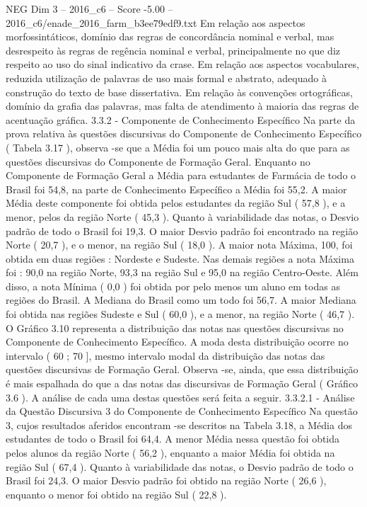 \begin{textsample}{NEG Dim 3 – 2016\_c6 – Score -5.00 – 2016\_c6/enade\_2016\_farm\_b3ee79edf9.txt}
Em relação aos aspectos morfossintáticos, domínio das regras de concordância nominal e verbal, mas desrespeito às regras de regência nominal e verbal, principalmente no que diz respeito ao uso do sinal indicativo da crase.
Em relação aos aspectos vocabulares, reduzida utilização de palavras de uso mais formal e abstrato, adequado à construção do texto de base dissertativa.
Em relação às convenções ortográficas, domínio da grafia das palavras, mas falta de atendimento à maioria das regras de acentuação gráfica. 3.3.2 - Componente de Conhecimento Específico Na parte da prova relativa às questões discursivas do Componente de Conhecimento Específico ( Tabela 3.17 ), observa -se que a Média foi um pouco mais alta do que para as questões discursivas do Componente de Formação Geral.
Enquanto no Componente de Formação Geral a Média para estudantes de Farmácia de todo o Brasil foi 54,8, na parte de Conhecimento Específico a Média foi 55,2.
A maior Média deste componente foi obtida pelos estudantes da região Sul ( 57,8 ), e a menor, pelos da região Norte ( 45,3 ).
Quanto à variabilidade das notas, o Desvio padrão de todo o Brasil foi 19,3.
O maior Desvio padrão foi encontrado na região Norte ( 20,7 ), e o menor, na região Sul ( 18,0 ).
A maior nota Máxima, 100, foi obtida em duas regiões : Nordeste e Sudeste.
Nas demais regiões a nota Máxima foi : 90,0 na região Norte, 93,3 na região Sul e 95,0 na região Centro-Oeste.
Além disso, a nota Mínima ( 0,0 ) foi obtida por pelo menos um aluno em todas as regiões do Brasil.
A Mediana do Brasil como um todo foi 56,7.
A maior Mediana foi obtida nas regiões Sudeste e Sul ( 60,0 ), e a menor, na região Norte ( 46,7 ).
O Gráfico 3.10 representa a distribuição das notas nas questões discursivas no Componente de Conhecimento Específico.
A moda desta distribuição ocorre no intervalo ( 60 ; 70 ], mesmo intervalo modal da distribuição das notas das questões discursivas de Formação Geral.
Observa -se, ainda, que essa distribuição é mais espalhada do que a das notas das discursivas de Formação Geral ( Gráfico 3.6 ).
A análise de cada uma destas questões será feita a seguir. 3.3.2.1 - Análise da Questão Discursiva 3 do Componente de Conhecimento Específico Na questão 3, cujos resultados aferidos encontram -se descritos na Tabela 3.18, a Média dos estudantes de todo o Brasil foi 64,4.
A menor Média nessa questão foi obtida pelos alunos da região Norte ( 56,2 ), enquanto a maior Média foi obtida na região Sul ( 67,4 ).
Quanto à variabilidade das notas, o Desvio padrão de todo o Brasil foi 24,3.
O maior Desvio padrão foi obtido na região Norte ( 26,6 ), enquanto o menor foi obtido na região Sul ( 22,8 ).

\end{textsample}
